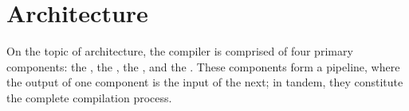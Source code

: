 \section{Architecture}
\label{sec:architecture}

On the topic of architecture, the \lang{} compiler is comprised of four primary
components: the \lexer, the \parser, the \semantic, and the \codeGen. These
components form a pipeline, where the output of one component is the input of the
next; in tandem, they constitute the complete compilation process. 








